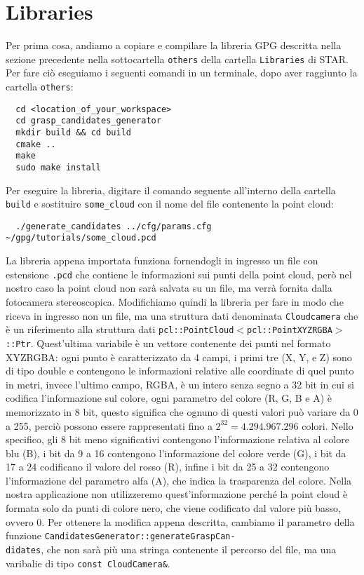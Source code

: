 \documentclass{report}
\begin{document}
\section{Libraries}
Per prima cosa, andiamo a copiare e compilare la libreria GPG descritta nella sezione precedente nella sottocartella \texttt{others} della cartella \texttt{Libraries} di STAR. Per fare ciò eseguiamo i seguenti comandi in un terminale, dopo aver raggiunto la cartella \texttt{others}:
\begin{verbatim}
  cd <location_of_your_workspace>  
  cd grasp_candidates_generator
  mkdir build && cd build
  cmake ..
  make
  sudo make install
\end{verbatim}
Per eseguire la libreria, digitare il comando seguente all'interno della cartella \texttt{build} e sostituire \texttt{some\_cloud} con il nome del file contenente la point cloud:
\begin{verbatim}
  ./generate_candidates ../cfg/params.cfg ~/gpg/tutorials/some_cloud.pcd
\end{verbatim}
La libreria appena importata funziona fornendogli in ingresso un file con estensione \texttt{.pcd} che contiene le informazioni sui punti della point cloud, però nel nostro caso la point cloud non sarà salvata su un file, ma verrà fornita dalla fotocamera stereoscopica. Modifichiamo quindi la libreria per fare in modo che riceva in ingresso non un file, ma una struttura dati denominata \texttt{Cloudcamera} che è un riferimento alla struttura dati \texttt{pcl::PointCloud$<$pcl::PointXYZRGBA$>$::Ptr}. Quest'ultima variabile è un vettore contenente dei punti nel formato XYZRGBA: ogni punto è caratterizzato da 4 campi, i primi tre (X, Y, e Z) sono di tipo double e contengono le informazioni relative alle coordinate di quel punto in metri, invece l'ultimo campo, RGBA, è un intero senza segno a 32 bit in cui si codifica l'informazione sul colore, ogni parametro del colore (R, G, B e A) è memorizzato in 8 bit, questo significa che ognuno di questi valori può variare da 0 a 255, perciò possono essere rappresentati fino a $\displaystyle{2^{32}=4.294.967.296}$ colori. Nello specifico, gli 8 bit meno significativi contengono l'informazione relativa al colore blu (B), i bit da 9 a 16 contengono l'informazione del colore verde (G), i bit da 17 a 24 codificano il valore del rosso (R), infine i bit da 25 a 32 contengono l'informazione del parametro alfa (A), che indica la trasparenza del colore. Nella nostra applicazione non utilizzeremo quest'informazione perché la point cloud è formata solo da punti di colore nero, che viene codificato dal valore più basso, ovvero 0. Per ottenere la modifica appena descritta, cambiamo il parametro della funzione \texttt{CandidatesGenerator::generateGraspCan-}\\\texttt{didates}, che non sarà più una stringa contenente il percorso del file, ma una varibalie di tipo \texttt{const CloudCamera\&}. \par
\end{document}
